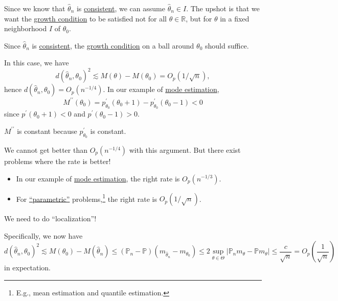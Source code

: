 Since we know that \(\hat{\theta } _n \) is \hyperref[def:consistent]{consistent}, we can assume \(\hat{\theta } _n \in I\). The upshot is that we want the \hyperref[def:growth-condition]{growth condition} to be satisfied not for all \(\theta \in \mathbb{R} \), but for \(\theta \) in a fixed neighborhood \(I\) of \(\theta _0\).

\begin{intuition}
	Since \(\hat{\theta } _n \) is \hyperref[def:consistent]{consistent}, the \hyperref[def:growth-condition]{growth condition} on a ball around \(\theta _0\) should suffice.
\end{intuition}

In this case, we have
\[
	d(\hat{\theta } _n, \theta _0)^2 \lesssim M(\theta ) - M(\theta _0) = O_p(1 / \sqrt{n} ),
\]
hence \(d(\hat{\theta } _n, \theta _0) = O_p(n^{-1 / 4})\). In our example of \hyperref[eg:mode-estimation]{mode estimation},
\[
	M^{\prime\prime} (\theta _0)
	= p_{\theta _0}^{\prime} (\theta _0 + 1) - p_{\theta _0}^{\prime} (\theta _0 - 1)
	< 0
\]
since \(p^{\prime} (\theta _0+1) < 0\) and \(p^{\prime} (\theta _0 - 1) > 0\).

\begin{note}
	\(M^{\prime\prime} \) is constant because \(p_{\theta _0}^{\prime} \) is constant.
\end{note}

\begin{remark}
	We cannot get better than \(O_p(n^{-1 / 4})\) with this argument. But there exist problems where the rate is better!
	\begin{itemize}
		\item In our example of \hyperref[eg:mode-estimation]{mode estimation}, the right rate is \(O_p(n^{-1 / 3})\).
		\item For \hyperref[def:parametric]{``parametric''} problems,\footnote{E.g., mean estimation and quantile estimation.} the right rate is \(O_p(1 / \sqrt{n} )\).
	\end{itemize}
	We need to do ``localization''!
\end{remark}

Specifically, we now have
\[
	d(\hat{\theta } _n, \theta _0)^2
	\lesssim M(\theta _0) - M(\hat{\theta } _n )
	\leq (\mathbb{P} _n - \mathbb{P} ) (m_{\hat{\theta } _n } - m_{\theta _0})
	\leq 2 \sup _{\theta \in \Theta } \vert \mathbb{P} _n m_\theta - \mathbb{P} m_\theta \vert
	\leq \frac{c}{\sqrt{n} }
	= O_p \left( \frac{1}{\sqrt{n} } \right)
\]
in expectation.

